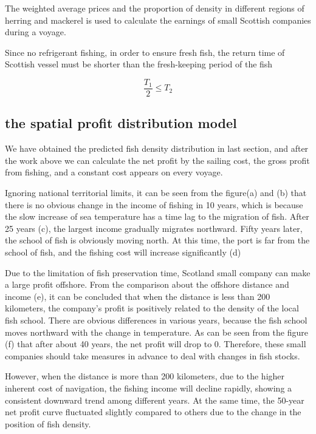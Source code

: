\documentclass{mcmthesis}
\begin{document}
The weighted average prices and the proportion of density in different regions of herring and mackerel  is used to calculate the earnings of small Scottish companies during a voyage. 

Since no refrigerant fishing, in order to ensure fresh fish, the return time of Scottish vessel  must be shorter than the fresh-keeping period of the fish

\begin{equation}\label{10}
\frac{T_1}{2}\leq T_2
\end{equation}



\subsection{the spatial profit distribution model}
  We have obtained the predicted fish density distribution in last section, and after the work above we can calculate the net profit by the sailing cost, the gross profit from fishing, and a constant cost appears on every voyage.
  
Ignoring national territorial limits, it can be seen from the figure(a) and (b) that there is no obvious change in the income of fishing in 10 years, which is because the slow increase of sea temperature has a time lag to the migration of fish. After 25 years (c), the largest income gradually migrates northward. Fifty years later, the school of fish is obviously moving north. At this time, the port is far from the school of fish, and the fishing cost will increase significantly (d)

Due to the limitation of fish preservation time,  Scotland small company can make a large profit offshore. From the comparison about the offshore distance and income (e), it can be concluded that when the distance is less than 200 kilometers, the company's profit is positively related to the density of the local fish school. There are obvious differences in various years, because the fish school moves northward with the change in temperature. As can be seen from the figure (f) that after about 40 years, the net profit will drop to 0. Therefore, these small companies should take measures in advance to deal with changes in fish stocks.

However, when the distance is more than 200 kilometers, due to the higher inherent cost of navigation, the fishing income will decline rapidly, showing a consistent downward trend among different years. At the same time, the 50-year net profit  curve fluctuated slightly compared to others due to the change in the position of fish density.
\end{document}
